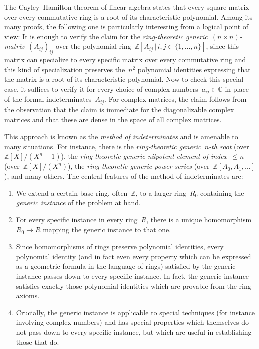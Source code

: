\documentclass[10pt,reqno,a4paper,openany]{amsbook}
\theoremstyle{definition}
\theoremstyle{plain}
\theoremstyle{remark}
\newcommand{\ZZ}{\mathbb{Z}}
\newcommand{\CC}{\mathbb{C}}
\newcommand{\?}{\,{:}\,}
\renewcommand{\_}{\mathpunct{.}\,}
\renewcommand{\theenumi}{\alph{enumi}}
\begin{document}
The Cayley--Hamilton theorem of linear algebra states that every square matrix
over every commutative ring is a root of its characteristic polynomial. Among
its many proofs, the following one is particularly interesting from a logical
point of view: It is enough to verify the claim for the \emph{ring-theoretic
generic~$(n \times n)$-matrix}~$(A_{ij})_{ij}$ over the polynomial
ring~$\ZZ[A_{ij}\,|\,i,j\in\{1,\ldots,n\}]$, since this matrix can specialize
to every specific matrix over every commutative ring and this kind of specialization
preserves the~$n^2$ polynomial identities expressing that the matrix is a root
of its characteristic polynomial. Now to check this special case, it suffices to
verify it for every choice of complex numbers~$a_{ij} \in \CC$ in place of the
formal indeterminates~$A_{ij}$. For complex matrices, the claim follows from
the observation that the claim is immediate for the diagonalizable complex
matrices and that these are dense in the space of all complex matrices.

This approach is known as the \emph{method of indeterminates} and is amenable
to many situations. For instance, there is the
\emph{ring-theoretic generic~$n$-th root} (over~$\ZZ[X]/(X^n-1)$), the
\emph{ring-theoretic generic nilpotent element of index~$\leq n$}
(over~$\ZZ[X]/(X^n)$), the \emph{ring-theoretic generic power series}
(over~$\ZZ[A_0,A_1,\ldots]$), and many others. The central features of the
method of indeterminates are:
\begin{enumerate}
\renewcommand{\theenumi}{\arabic{enumi}}
\item We extend a certain base ring, often~$\ZZ$, to a larger ring~$R_0$ containing
the \emph{generic instance} of the problem at hand.
\item For every specific instance in every ring~$R$, there is a unique
homomorphism~$R_0 \to R$ mapping the generic instance to that one.
\item Since homomorphisms of rings preserve polynomial identities, every
polynomial identity (and in fact even every property which can be expressed as a
geometric formula in the language of rings) satisfied by the generic instance
passes down to every specific instance. In fact, the generic instance satisfies
exactly those polynomial identities which are provable from the ring axioms.
\item Crucially, the generic instance is applicable to special techniques (for
instance involving complex numbers) and has special properties which themselves
do not pass down to every specific instance, but which are useful in
establishing those that do.
\end{enumerate}
\end{document}
